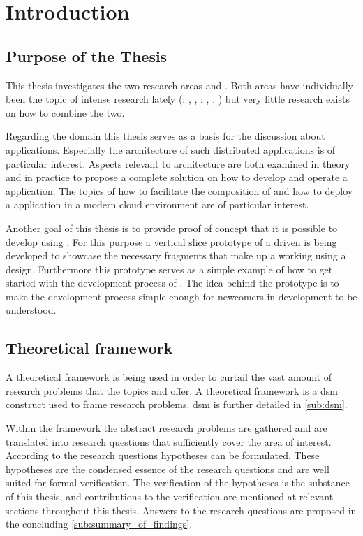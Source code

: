 \chapter{Introduction}

\section{Purpose of the Thesis}

This thesis investigates the two research areas \mss{} and
\ogs{}. Both areas have individually been the topic of intense research lately
(\mss{}: \cite{zimmermann2016microservices}, \cite{di2017research},
\ogs{}: \cite{bosch2017towards}, \cite{smed2017algorithms},
\cite{liu2017apparatus}) but very little research exists on how to combine the
two.

Regarding the \mss{} domain this thesis serves as a basis for the discussion
about \ms{} applications. Especially the architecture of such distributed \ms{}
applications is of particular interest. Aspects relevant to architecture are
both examined in theory and in practice to propose a complete solution on how to
develop and operate a \ms{} application. The topics of how to facilitate the
composition of \mss{} and how to deploy a \ms{} application in a modern cloud
environment are of particular interest.

Another goal of this thesis is to provide proof of concept that it is possible
to develop \ogs{} using \mss{}. For this purpose a vertical slice prototype of a
\ms{} driven \og{} is being developed to showcase the necessary fragments that
make up a working \og{} using a \ms{} design. Furthermore this prototype serves
as a simple example of how to get started with the development process of
\ogs{}. The idea behind the prototype is to make the development process simple
enough for newcomers in \og{} development to be understood.


\section{Theoretical framework}
\label{sec:theoretical_framework}

A theoretical framework is being used in order to curtail the vast amount of
research problems that the topics \ogs{} and \mss{} offer. A theoretical
framework is a \gls{dsm} construct used to frame research problems. \gls{dsm} is
further detailed in \autoref{sub:dsm}.

Within the framework the abstract research problems are gathered and are
translated into research questions that sufficiently cover the area of interest.
According to the research questions hypotheses can be formulated. These
hypotheses are the condensed essence of the research questions and are well
suited for formal verification. The verification of the hypotheses is the
substance of this thesis, and contributions to the verification are mentioned at
relevant sections throughout this thesis. Answers to the research questions
are proposed in the concluding \autoref{sub:summary_of_findings}.

